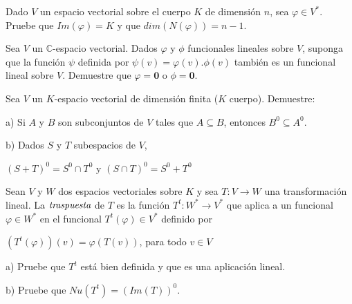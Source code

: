 \begin{exercise}
\item

Dado $V$ un espacio vectorial  sobre el cuerpo  $K$ de dimensión $n$, sea $\varphi \in V^*$. Pruebe que $Im(\varphi)=K$ y que $dim(N(\varphi))=n-1$.
\end{exercise}
\begin{exercise}
\item

Sea $V$ un $\mathbb{C}$-espacio vectorial. Dados $\varphi$ y $\phi$ funcionales lineales sobre $V$, suponga que la función $\psi$ definida por $\psi(v)=\varphi(v).\phi(v)$ también es un funcional lineal sobre $V$. Demuestre que $\varphi=\textbf{0}$ o $\phi=\textbf{0}$.
\end{exercise}

\begin{exercise}
 \item
  
 Sea $V$ un $K$-espacio vectorial de dimensión finita ($K$ cuerpo). Demuestre: 
 
 
 a) Si $A$ y $B$ son subconjuntos de $V$ tales que $A\subseteq B$, entonces $B^0\subseteq A^0$.
 
 b) Dados $S$ y $T$ subespacios de $V$,
 
 $(S+T)^0=S^0 \cap T^0$ y $(S \cap T)^0=S^0+T^0$
\end{exercise}

\begin{exercise}
\item
 
 
 Sean $V$ y $W$ dos espacios vectoriales sobre $K$ y sea $T:V \rightarrow  W$ una transformación lineal. La $\emph{traspuesta}$   de $T$ es la función 
 $T^t:W^* \rightarrow V^*$  que aplica a un funcional $ \varphi \in W^*$  en el funcional $T^t(\varphi) \in V^*$ definido por
 
 \begin{center}
 $(T^t(\varphi))(v)= \varphi(T(v))$, para todo $v \in V$
 \end{center} 

 
a)  Pruebe que $T^t$ está bien definida y que es una aplicación lineal.

b) Pruebe que $Nu(T^t)=(Im(T))^0$.

\end{exercise} 



 \bigskip


